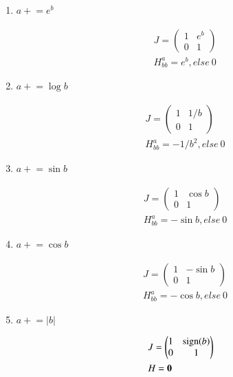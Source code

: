 \documentclass[aps,twocolumn,longbibliography,english,superscriptaddress]{revtex4-1}
\newcommand{\<}{\langle}
\renewcommand{\>}{\rangle}
\theoremstyle{definition}\newtheorem{definition}{\textit{Definition}}
\begin{document}
\begin{enumerate}
\item $a\mathrel+=e^b$

\begin{align*}
    &J = \left(\begin{matrix}
1 &  e^b \\
0 & 1
\end{matrix}\right)\\
    &H^a_{bb} = e^b, else ~0
\end{align*}

\item $a\mathrel+=\log b$

\begin{align*}
    &J = \left(\begin{matrix}
1 &  1/b \\
0 & 1
\end{matrix}\right)\\
    &H^a_{bb} = -1/b^2, else ~0
\end{align*}

\item $a\mathrel+=\sin b$

\begin{align*}
    &J = \left(\begin{matrix}
1 &  \cos b \\
0 & 1
\end{matrix}\right)\\
    &H^a_{bb} = -\sin b, else ~0
\end{align*}

\item $a\mathrel+=\cos b$

\begin{align*}
    &J = \left(\begin{matrix}
1 &  -\sin b \\
0 & 1
\end{matrix}\right)\\
    &H^a_{bb} = -\cos b, else ~0
\end{align*}

\item $a \mathrel+= \vert b\vert$

\begin{align*}
    &J = \left(\begin{matrix}
1 &  {\rm sign} (b) \\
0 & 1
\end{matrix}\right)\\
    &H = \mathbf{0}
\end{align*}


\end{enumerate}
\end{document}
